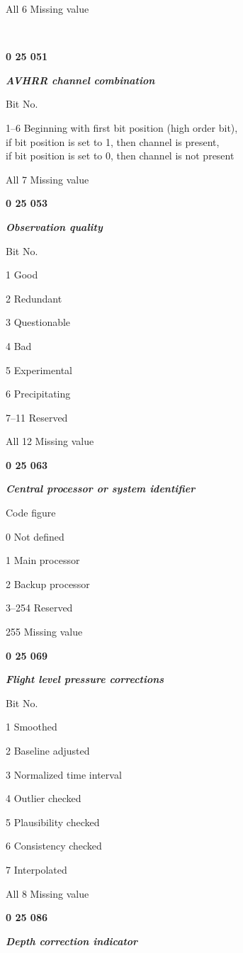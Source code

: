 All 6 Missing value

\textbf{\\
}

\textbf{0 25 051}

\emph{\textbf{AVHRR channel combination}}

Bit No.

1--6 Beginning with first bit position (high order bit),\\
if bit position is set to 1, then channel is present,\\
if bit position is set to 0, then channel is not present

All 7 Missing value

\textbf{0 25 053}

\emph{\textbf{Observation quality}}

Bit No.

1 Good

2 Redundant

3 Questionable

4 Bad

5 Experimental

6 Precipitating

7--11 Reserved

All 12 Missing value

\textbf{0 25 063}

\emph{\textbf{Central processor or system identifier}}

Code figure

0 Not defined

1 Main processor

2 Backup processor

3--254 Reserved

255 Missing value

\textbf{0 25 069}

\emph{\textbf{Flight level pressure corrections}}

Bit No.

1 Smoothed

2 Baseline adjusted

3 Normalized time interval

4 Outlier checked

5 Plausibility checked

6 Consistency checked

7 Interpolated

All 8 Missing value

\textbf{0 25 086}

\emph{\textbf{Depth correction indicator}}

